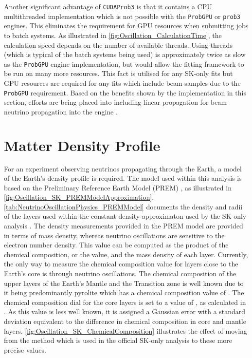 Another significant advantage of \texttt{CUDAProb3} is that it contains a CPU multithreaded implementation which is not possible with the \texttt{ProbGPU} or \texttt{prob3} engines. This eliminates the requirement for GPU resources when submitting jobs to batch systems. As illustrated in \autoref{fig:Oscillation_CalculationTime}, the calculation speed depends on the number of available threads. Using  threads (which is typical of the batch systems being used) is approximately twice as slow as the \texttt{ProbGPU} engine implementation, but would allow the fitting framework to be run on many more resources. This fact is utilised for any SK-only fits but GPU resources are required for any fits which include beam samples due to the \texttt{ProbGPU} requirement. Based on the benefits shown by the implementation in this section, efforts are being placed into including linear propagation for beam neutrino propagation into the engine \cite{Liban}.

\section{Matter Density Profile}
\label{sec:Oscillation_MatterDensity}


For an experiment observing neutrinos propagating through the Earth, a model of the Earth's density profile is required. The model used within this analysis is based on the Preliminary Reference Earth Model (PREM) \cite{Dziewonski1981-sp}, as illustrated in \autoref{fig:Oscillation_SK_PREMModelApproximation}. \autoref{tab:NeutrinoOscillationPhysics_PREMModel} documents the density and radii of the layers used within the constant density approximaton used by the SK-only analysis \cite{thesis_roger}. The density measurements provided in the PREM model are provided in terms of mass density, whereas neutrino oscillations are sensitive to the electron number density. This value can be computed as the product of the chemical composition, or the  value, and the mass density of each layer. Currently, the only way to measure the chemical composition value for layers close to the Earth's core is through neutrino oscillations. The chemical composition of the upper layers of the Earth's Mantle and the Transition zone is well known due to it being predominantly pyrolite which has a chemical composition value of  \cite{Bourret_2017}. The chemical composition dial for the core layers is set to a value of , as calculated in \cite{Rott2015}. As this value is less well known, it is assigned a Gaussian error with a standard deviation equivalent to the difference in chemical composition in core and mantle layers. \autoref{fig:Oscillation_SK_ChemicalComposition} illustrates the effect of moving from the  method which is used in the official SK-only analysis to these more precise values.

